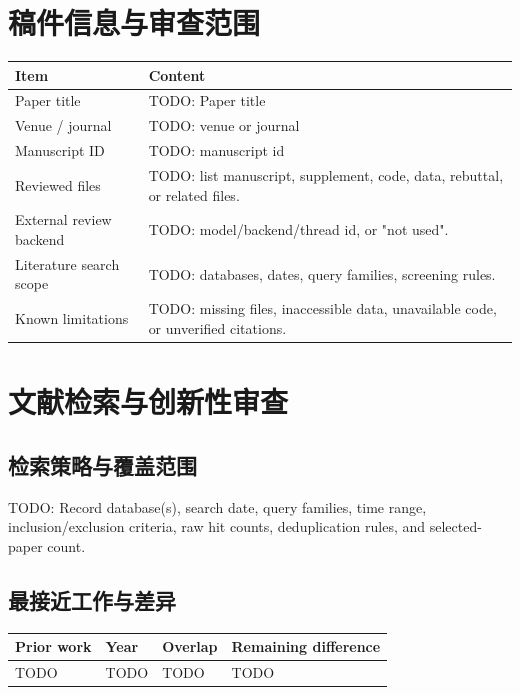 \documentclass[11pt,a4paper]{article}
\newcommand{\PaperTitle}{TODO: Paper title}
\newcommand{\VenueName}{TODO: venue or journal}
\newcommand{\ManuscriptId}{TODO: manuscript id}
\begin{document}
\section{稿件信息与审查范围}

\begin{longtable}{p{}p{}}
\toprule
\textbf{Item} & \textbf{Content} \\
\midrule
Paper title & \PaperTitle \\
Venue / journal & \VenueName \\
Manuscript ID & \ManuscriptId \\
Reviewed files & TODO: list manuscript, supplement, code, data, rebuttal, or related files. \\
External review backend & TODO: model/backend/thread id, or "not used". \\
Literature search scope & TODO: databases, dates, query families, screening rules. \\
Known limitations & TODO: missing files, inaccessible data, unavailable code, or unverified citations. \\
\bottomrule
\end{longtable}

\section{文献检索与创新性审查}

\subsection{检索策略与覆盖范围}
TODO: Record database(s), search date, query families, time range, inclusion/exclusion criteria, raw hit counts, deduplication rules, and selected-paper count.

\subsection{最接近工作与差异}
\begin{longtable}{p{}p{}p{}p{}}
\toprule
\textbf{Prior work} & \textbf{Year} & \textbf{Overlap} & \textbf{Remaining difference} \\
\midrule
TODO & TODO & TODO & TODO \\
\bottomrule
\end{longtable}
\end{document}
